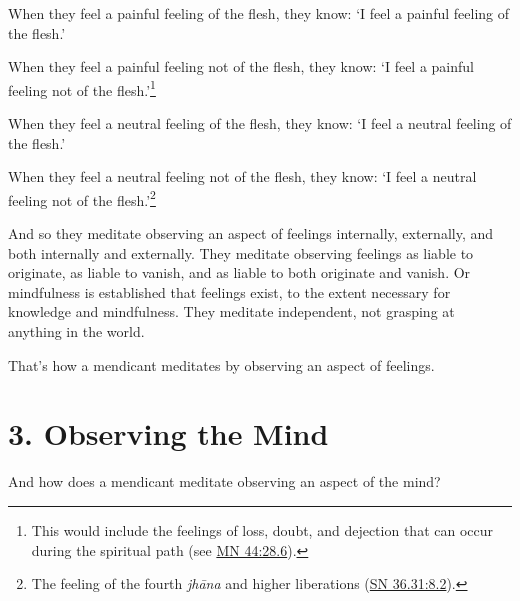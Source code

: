 \documentclass[12pt,openany]{book}%
\begin{document}
When they feel a painful feeling of the flesh, they know: ‘I feel a painful feeling of the flesh.’ 

When they feel a painful feeling not of the flesh, they know: ‘I feel a painful feeling not of the flesh.’\footnote{This would include the feelings of loss, doubt, and dejection that can occur during the spiritual path (see \href{https://suttacentral.net/mn44/en/sujato\#28.6}{MN 44:28.6}). } 

When they feel a neutral feeling of the flesh, they know: ‘I feel a neutral feeling of the flesh.’ 

When they feel a neutral feeling not of the flesh, they know: ‘I feel a neutral feeling not of the flesh.’\footnote{The feeling of the fourth \textit{\textsanskrit{jhāna}} and higher liberations (\href{https://suttacentral.net/sn36.31/en/sujato\#8.2}{SN 36.31:8.2}). } 

And so they meditate observing an aspect of feelings internally, externally, and both internally and externally. They meditate observing feelings as liable to originate, as liable to vanish, and as liable to both originate and vanish. Or mindfulness is established that feelings exist, to the extent necessary for knowledge and mindfulness. They meditate independent, not grasping at anything in the world. 

That’s how a mendicant meditates by observing an aspect of feelings. 

\section*{3. Observing the Mind }

And how does a mendicant meditate observing an aspect of the mind? 
\end{document}
